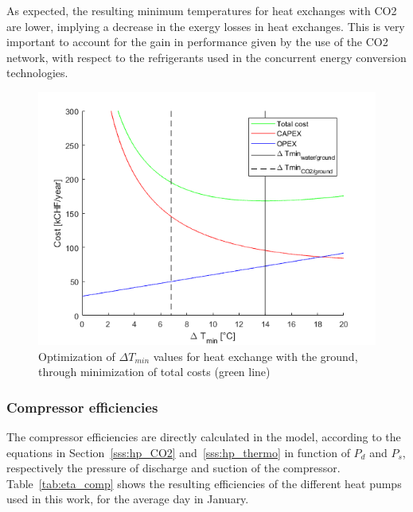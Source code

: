 \documentclass{article}
\begin{document}
As expected, the resulting minimum temperatures for heat exchanges with CO2 are lower, implying a decrease in the exergy losses in heat exchanges. This is very important to account for the gain in performance given by the use of the CO2 network, with respect to the refrigerants used in the concurrent energy conversion technologies.

\begin{figure}[tph]
	\centering
	\includegraphics[width=0.7\linewidth]{dtmin_gtw}
	\caption{Optimization of $\Delta T_{min}$ values for heat exchange with the ground, through minimization of total costs (green line)}
	\label{fig:dtmin_gtw}
\end{figure}


\subsubsection{Compressor efficiencies}
The compressor efficiencies are directly calculated in the model, according to the equations in Section~\ref{sss:hp_CO2} and~\ref{sss:hp_thermo} in function of $P_{d}$ and $P_{s}$, respectively the pressure of discharge and suction of the compressor. Table~\ref{tab:eta_comp} shows the resulting efficiencies of the different heat pumps used in this work, for the average day in January.
\end{document}

